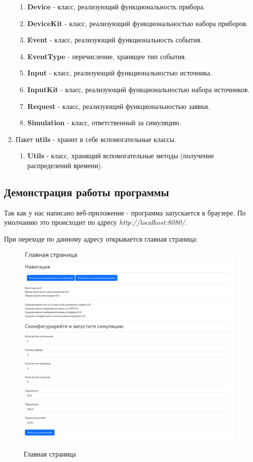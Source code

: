 \documentclass[a4paper, 14pt]{article}
\begin{document}
\begin{enumerate}
\begin{enumerate}
		\item \textbf{Device} - класс, реализующий функциональность прибора.
		\item \textbf{DeviceKit} - класс, реализующий функциональностью набора приборов.
		\item \textbf{Event} - класс, реализующий функциональность события.
		\item \textbf{EventType} - перечисление, хранящее тип события.
		\item \textbf{Input} - класс, реализующий функциональностью источника.
		\item \textbf{InputKit} - класс, реализующий функциональностью набора источников.
		\item \textbf{Request} - класс, реализующий функциональностью заявки.
		\item \textbf{Simulation} - класс, ответственный за симуляцию.
	\end{enumerate}
	\item Пакет \textbf{utils} - хранит в себе вспомогательные классы.
	\begin{enumerate}
		\item \textbf{Utils} - класс, хранящий вспомогательные методы (получение распределений времени).
	\end{enumerate}
\end{enumerate}

\subsection{Демонстрация работы программы}

Так как у нас написано веб-приложение - программа запускается в браузере. По умолчанию это происходит по адресу \textit{http://localhost:8080/}.

При переходе по данному адресу открывается главная страница:

\begin{figure}[H]
	\centering
	\includegraphics[width=15cm]{screenshots/1.png}\\
	\caption{Главная страница}
\end{figure}
\end{document}
